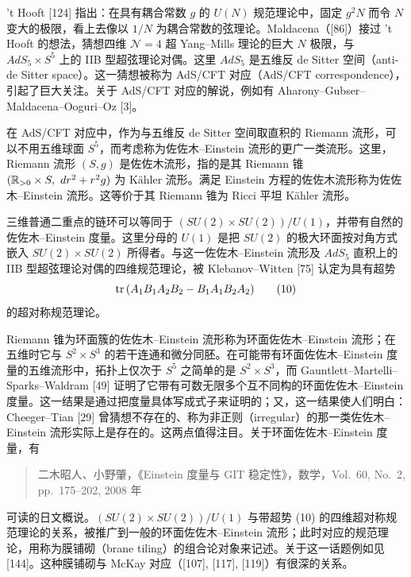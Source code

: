 't Hooft [124] 指出：在具有耦合常数 $g$ 的 $U(N)$ 规范理论中，固定 $g^2N$ 而令 $N$ 变大的极限，看上去像以 $1/N$ 为耦合常数的弦理论。Maldacena（[86]）接过 't Hooft 的想法，猜想四维 $\mathcal{N}=4$ 超 Yang–Mills 理论的巨大 $N$ 极限，与 $AdS_5\times S^5$ 上的 IIB 型超弦理论对偶。这里 $AdS_5$ 是五维反 de Sitter 空间（anti-de Sitter space）。这一猜想被称为 AdS/CFT 对应（AdS/CFT correspondence），引起了巨大关注。关于 AdS/CFT 对应的解说，例如有 Aharony–Gubser–Maldacena–Ooguri–Oz [3]。

在 AdS/CFT 对应中，作为与五维反 de Sitter 空间取直积的 Riemann 流形，可以不用五维球面 $S^5$，而考虑称为佐佐木–Einstein 流形的更广一类流形。这里，Riemann 流形 $(S,g)$ 是佐佐木流形，指的是其 Riemann 锥 $(\mathbb{R}_{>0}\times S,\ dr^2+r^2g)$ 为 Kähler 流形。满足 Einstein 方程的佐佐木流形称为佐佐木–Einstein 流形。这等价于其 Riemann 锥为 Ricci 平坦 Kähler 流形。

三维普通二重点的链环可以等同于 $(SU(2)\times SU(2))/U(1)$，并带有自然的佐佐木–Einstein 度量。这里分母的 $U(1)$ 是把 $SU(2)$ 的极大环面按对角方式嵌入 $SU(2)\times SU(2)$ 所得者。与这一佐佐木–Einstein 流形及 $AdS_5$ 直积上的 IIB 型超弦理论对偶的四维规范理论，被 Klebanov–Witten [75] 认定为具有超势
\begin{equation*}
\operatorname{tr}\,(A_1B_1A_2B_2-B_1A_1B_2A_2)
\tag{10}
\end{equation*}
的超对称规范理论。

Riemann 锥为环面簇的佐佐木–Einstein 流形称为环面佐佐木–Einstein 流形；在五维时它与 $S^2\times S^3$ 的若干连通和微分同胚。在可能带有环面佐佐木–Einstein 度量的五维流形中，拓扑上仅次于 $S^5$ 之简单的是 $S^2\times S^3$，而 Gauntlett–Martelli–Sparks–Waldram [49] 证明了它带有可数无限多个互不同构的环面佐佐木–Einstein 度量。这一结果是通过把度量具体写成式子来证明的；又，这一结果使人们明白：Cheeger–Tian [29] 曾猜想不存在的、称为非正则（irregular）的那一类佐佐木–Einstein 流形实际上是存在的。这两点值得注目。关于环面佐佐木–Einstein 度量，有
\begin{quote}
\noindent [二小 08] 二木昭人、小野肇，《Einstein 度量与 GIT 稳定性》，数学，Vol.\ 60, No.\ 2, pp.\ 175--202, 2008 年
\end{quote}
可读的日文概说。$(SU(2)\times SU(2))/U(1)$ 与带超势 (10) 的四维超对称规范理论的关系，被推广到一般的环面佐佐木–Einstein 流形；此时对应的规范理论，用称为膜铺砌（brane tiling）的组合论对象来记述。关于这一话题例如见 [144]。这种膜铺砌与 McKay 对应（[107], [117], [119]）有很深的关系。

